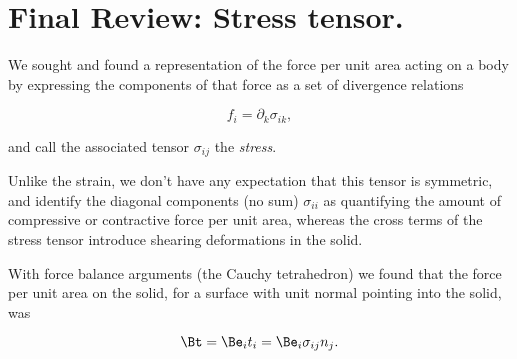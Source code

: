\section{Final Review: Stress tensor.}

We sought and found a representation of the force per unit area acting on a body by expressing the components of that force as a set of divergence relations

\begin{equation}\label{eqn:continuumElasticityReview:250}
f_i = \partial_k \sigma_{i k},
\end{equation}

and call the associated tensor $\sigma_{ij}$ the \textit{stress}.

Unlike the strain, we don't have any expectation that this tensor is symmetric, and identify the diagonal components (no sum) $\sigma_{i i}$ as quantifying the amount of compressive or contractive force per unit area, whereas the cross terms of the stress tensor introduce shearing deformations in the solid.

With force balance arguments (the Cauchy tetrahedron) we found that the force per unit area on the solid, for a surface with unit normal pointing into the solid, was

\begin{equation}\label{eqn:continuumElasticityReview:270}
\Bt = \Be_i t_i = \Be_i \sigma_{ij} n_j.
\end{equation}

